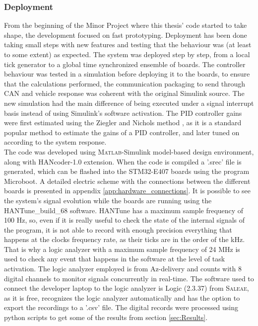 \documentclass[table,xcdraw]{article}
\begin{document}
\subsubsection{Deployment}
From the beginning of the Minor Project where this thesis' code started to take shape, the development focused on fast prototyping. Deployment has been done taking small steps with new features and testing that the behaviour was (at least to some extent) as expected. The system was deployed step by step, from a local tick generator to a global time synchronized ensemble of boards. The controller behaviour was tested in a simulation before deploying it to the boards, to ensure that the calculations performed, the communication packaging to send through CAN and vehicle response was coherent with the original Simulink source. The new simulation had the main difference of being executed under a signal interrupt basis instead of using Simulink's software activation. The PID controller gains were first estimated using the Ziegler and Nichols method \citep{ziegler_nichols}, as it is a standard popular method to estimate the gains of a PID controller, and later tuned on according to the system response.\\

The code was developed using \textsc{Matlab}-Simulink model-based design environment, along with HANcoder-1.0 extension. When the code is compiled a '.srec' file is generated, which can be flashed into the STM32-E407 boards using the program Microboot. A detailed electric scheme with the connections between the different boards is presented in appendix \ref{app:hardware_connections}. It is possible to see the system's signal evolution while the boards are running using the HANTune\_build\_68 software. HANTune has a maximum sample frequency of 100 Hz, so, even if it is really useful to check the state of the internal signals of the program, it is not able to record with enough precision everything that happens at the clocks frequency rate, as their ticks are in the order of the kHz. That is why a logic analyzer with a maximum sample frequency of 24 MHz is used to check any event that happens in the software at the level of task activation. The logic analyzer employed is from Az-delivery and counts with 8 digital channels to monitor signals concurrently in real-time. The software used to connect the developer laptop to the logic analyzer is Logic (2.3.37) from \textsc{Saleae}, as it is free, recognizes the logic analyzer automatically and has the option to export the recordings to a '.csv' file. The digital records were processed using python scripts to get some of the results from section \ref{sec:Results}.\\
\end{document}
